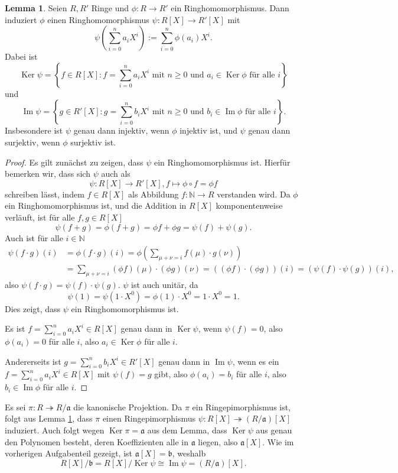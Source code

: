 \documentclass[a4paper,10pt]{article}
\theoremstyle{definition}
\newtheorem{lem}[beh]{Lemma}
\newcommand{\N}{\mathbb{N}}
\newcommand{\mf}[1]{\mathfrak{#1}}
\newcommand{\Img}{\operatorname{Im}}
\newcommand{\Ker}{\operatorname{Ker}}
\begin{document}
\begin{lem} \label{lem: ringhomo polynom}
 Seien $R, R'$ Ringe und $\phi: R \rightarrow R'$ ein Ringhomomorphismus. Dann induziert $\phi$ einen Ringhomomorphismus $\psi: R[X] \rightarrow R'[X]$ mit
  \[
   \psi\left( \sum_{i=0}^n a_i X^i \right) := \sum_{i=0}^n \phi(a_i) X^i.
  \]
  Dabei ist
  \[
   \Ker \psi = \left\{f \in R[X] : f = \sum_{i=0}^n a_i X^i \text{ mit } n \geq 0 \text{ und } a_i \in \Ker \phi \text{ für alle }i\right\}
  \]
  und
  \[
   \Img \psi = \left\{g \in R'[X] : g = \sum_{i=0}^n b_i X^i \text{ mit } n \geq 0 \text{ und } b_i \in \Img \phi \text{ für alle }i\right\}.
  \]
  Insbesondere ist $\psi$ genau dann injektiv, wenn $\phi$ injektiv ist, und $\psi$ genau dann surjektiv, wenn $\phi$ surjektiv ist.
\end{lem}
\begin{proof}
 Es gilt zunächst zu zeigen, dass $\psi$ ein Ringhomomorphismus ist. Hierfür bemerken wir, dass sich $\psi$ auch als
 \[
  \psi: R[X] \rightarrow R'[X], f \mapsto \phi \circ f = \phi f
 \]
 schreiben lässt, indem $f \in R[X]$ als Abbildung $f: \N \rightarrow R$ verstanden wird. Da $\phi$ ein Ringhomomorphismus ist, und die Addition in $R[X]$ komponentenweise verläuft, ist für alle $f,g \in R[X]$ 
 \[
  \psi(f+g) = \phi (f+g) = \phi f + \phi g = \psi(f) + \psi(g).
 \]
 Auch ist für alle $i \in \N$
 \begin{align*}
  \psi(f \cdot g)(i)
  &= \phi(f \cdot g)(i)
  = \phi\left( \sum_{\mu+\nu=i} f(\mu) \cdot g(\nu) \right) \\
  &= \sum_{\mu+\nu=i} (\phi f)(\mu) \cdot (\phi g)(\nu)
  = ((\phi f) \cdot (\phi g))(i)
  = (\psi(f) \cdot \psi(g))(i),
 \end{align*}
 also $\psi(f \cdot g) = \psi(f) \cdot \psi(g)$. $\psi$ ist auch unitär, da
  \[
   \psi(1) = \psi\left(1 \cdot X^0\right) = \phi(1) \cdot X^0 = 1 \cdot X^0 = 1.
  \]
 Dies zeigt, dass $\psi$ ein Ringhomomorphismus ist.
 
 Es ist $f = \sum_{i=0}^n a_i X^i \in R[X]$ genau dann in $\Ker \psi$, wenn $\psi(f) = 0$, also $\phi(a_i) = 0$ für alle $i$, also $a_i \in \Ker \phi$ für alle $i$.
 
 Andererseits ist $g = \sum_{i=0}^n b_i X^i \in R'[X]$ genau dann in $\Img \psi$, wenn es ein $f = \sum_{i=0}^n a_i X^i \in R[X]$ mit $\psi(f) = g$ gibt, also $\phi(a_i) = b_i$ für alle $i$, also $b_i \in \Img \phi$ für alle $i$.
\end{proof}

Es sei $\pi : R \twoheadrightarrow R/\mf{a}$ die kanonische Projektion. Da $\pi$ ein Ringepimorphismus ist, folgt aus Lemma \ref{lem: ringhomo polynom}, dass $\pi$ einen Ringepimorphismus $\psi: R[X] \twoheadrightarrow (R/\mf{a})[X]$ induziert. Auch folgt wegen $\Ker \pi = \mf{a}$ aus dem Lemma, dass $\Ker \psi$ aus genau den Polynomen besteht, deren Koeffizienten alle in $\mf{a}$ liegen, also $\mf{a}[X]$. Wie im vorherigen Aufgabenteil gezeigt, ist $\mf{a}[X] = \mf{b}$, weshalb
\[
 R[X]/\mf{b} = R[X]/\Ker\psi \cong \Img\psi = (R/\mf{a})[X].
\]
\end{document}
